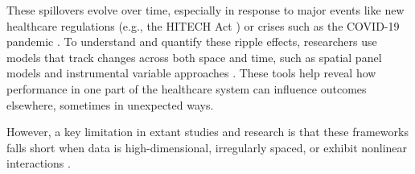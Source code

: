 \documentclass[10pt]{article}
\begin{document}
These spillovers evolve over time, especially in response to major events like new healthcare regulations (e.g., the HITECH Act \cite{noauthor_hitech_2011}) or crises such as the COVID-19 pandemic \cite{senathirajah_impact_2024}. To understand and quantify these ripple effects, researchers use models that track changes across both space and time, such as spatial panel models \cite{fischer_spatial_2010} and instrumental variable approaches \cite{chesher_what_2013}. These tools help reveal how performance in one part of the healthcare system can influence outcomes elsewhere, sometimes in unexpected ways.

However, a key limitation in extant studies and research is that these frameworks falls short when data is high-dimensional, irregularly spaced, or exhibit nonlinear interactions  \cite{zhou_essays_2018}.
\end{document}
